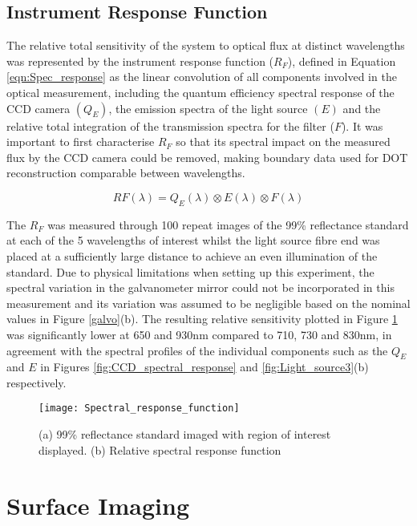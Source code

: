 \documentclass[twoside]{bhamthesis}
\theoremstyle{definition}
\begin{document}
\subsection{Instrument Response Function}
\label{appendix:IRF}

The relative total sensitivity of the system to optical flux at distinct wavelengths was represented by the instrument response function ($R_F$), defined in Equation \ref{eqn:Spec_response} as the linear convolution of all components involved in the optical measurement, including the quantum efficiency spectral response of the CCD camera $(Q_E)$, the emission spectra of the light source $(E)$ and the relative total integration of the transmission spectra for the filter ($F$). It was important to first characterise $R_F$ so that its spectral impact on the measured flux by the CCD camera could be removed, making boundary data used for DOT reconstruction comparable between wavelengths.

\begin{equation}
RF(\lambda) = Q_E(\lambda) \otimes E(\lambda) \otimes F(\lambda)
  \label{eqn:Spec_response}
\end{equation}

The $R_F$ was measured through 100 repeat images of the 99\% reflectance standard at each of the 5 wavelengths of interest whilst the light source fibre end was placed at a sufficiently large distance to achieve an even illumination of the standard. Due to physical limitations when setting up this experiment, the spectral variation in the galvanometer mirror could not be incorporated in this measurement and its variation was assumed to be negligible based on the nominal values in Figure \ref{galvo}(b). The resulting relative sensitivity plotted in Figure \ref{eqn:Spectral_response_function} was significantly lower at 650 and 930nm compared to 710, 730 and 830nm, in agreement with the spectral profiles of the individual components such as the $Q_E$ and $E$ in Figures \ref{fig:CCD_spectral_response} and \ref{fig:Light_source3}(b) respectively. 

\begin{figure}[!ht]
\centering
  \texttt{[image: Spectral\_response\_function]}
\caption{ (a) 99\% reflectance standard imaged with region of interest displayed. (b) Relative spectral response function}
  \label{eqn:Spectral_response_function}
\end{figure}

\section{Surface Imaging}
\label{Surface_imaging}
\end{document}
